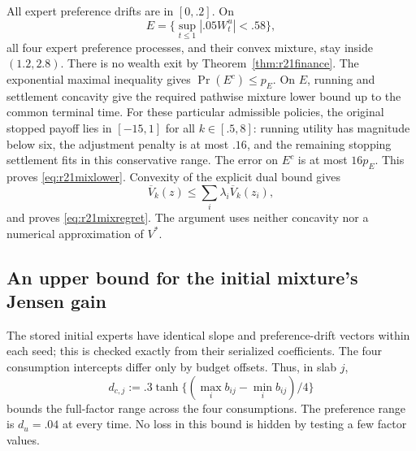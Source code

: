All expert preference drifts are in $[0,.2]$. On
\[
 E=\{\sup_{t\leq1}|.05W^u_t|<.58\},
\]
all four expert preference processes, and their convex mixture, stay inside $(1.2,2.8)$. There is no wealth exit by Theorem~\ref{thm:r21finance}. The exponential maximal inequality gives $\Pr(E^c)\leq p_E$. On $E$, running and settlement concavity give the required pathwise mixture lower bound up to the common terminal time. For these particular admissible policies, the original stopped payoff lies in $[-15,1]$ for all $k\in[.5,8]$: running utility has magnitude below six, the adjustment penalty is at most $.16$, and the remaining stopping settlement fits in this conservative range. The error on $E^c$ is at most $16p_E$. This proves \eqref{eq:r21mixlower}. Convexity of the explicit dual bound gives
\[
 \overline V_k(z)\leq\sum_i\lambda_i\overline V_k(z_i),
\]
and proves \eqref{eq:r21mixregret}. The argument uses neither concavity nor a numerical approximation of $V^*$.

\subsection{An upper bound for the initial mixture's Jensen gain}
The stored initial experts have identical slope and preference-drift vectors within each seed; this is checked exactly from their serialized coefficients. The four consumption intercepts differ only by budget offsets. Thus, in slab $j$,
\[
 d_{c,j}:=.3\tanh\{(\max_i b_{ij}-\min_i b_{ij})/4\}
\]
bounds the full-factor range across the four consumptions. The preference range is $d_u=.04$ at every time. No loss in this bound is hidden by testing a few factor values.

